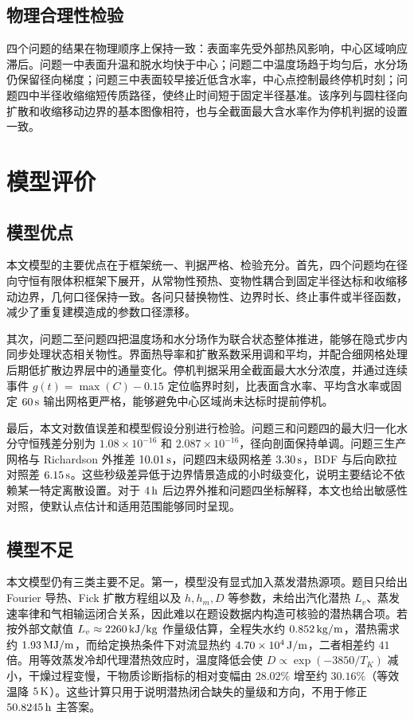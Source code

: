 \documentclass[UTF8,a4paper,12pt]{ctexart}
\numberwithin{equation}{section}
\begin{document}
\subsection{物理合理性检验}
四个问题的结果在物理顺序上保持一致：表面率先受外部热风影响，中心区域响应滞后。问题一中表面升温和脱水均快于中心；问题二中温度场趋于均匀后，水分场仍保留径向梯度；问题三中表面较早接近低含水率，中心点控制最终停机时刻；问题四中半径收缩缩短传质路径，使终止时间短于固定半径基准。该序列与圆柱径向扩散和收缩移动边界的基本图像相符，也与全截面最大含水率作为停机判据的设置一致。

\section{模型评价}
\subsection{模型优点}
本文模型的主要优点在于框架统一、判据严格、检验充分。首先，四个问题均在径向守恒有限体积框架下展开，从常物性预热、变物性耦合到固定半径达标和收缩移动边界，几何口径保持一致。各问只替换物性、边界时长、终止事件或半径函数，减少了重复建模造成的参数口径漂移。

其次，问题二至问题四把温度场和水分场作为联合状态整体推进，能够在隐式步内同步处理状态相关物性。界面热导率和扩散系数采用调和平均，并配合细网格处理后期低扩散边界层中的通量变化。停机判据采用全截面最大水分浓度，并通过连续事件 $g(t)=\max(C)-0.15$ 定位临界时刻，比表面含水率、平均含水率或固定 $60\rm\,s$ 输出网格更严格，能够避免中心区域尚未达标时提前停机。

最后，本文对数值误差和模型假设分别进行检验。问题三和问题四的最大归一化水分守恒残差分别为 $1.08\times10^{-16}$ 和 $2.087\times10^{-16}$，径向剖面保持单调。问题三生产网格与 Richardson 外推差 $10.01\rm\,s$，问题四末级网格差 $3.30\rm\,s$，BDF 与后向欧拉对照差 $6.15\rm\,s$。这些秒级差异低于边界情景造成的小时级变化，说明主要结论不依赖某一特定离散设置。对于 $4\rm\,h$ 后边界外推和问题四坐标解释，本文也给出敏感性对照，使默认点估计和适用范围能够同时呈现。

\subsection{模型不足}
本文模型仍有三类主要不足。第一，模型没有显式加入蒸发潜热源项。题目只给出 Fourier 导热、Fick 扩散方程组以及 $h,h_m,D$ 等参数，未给出汽化潜热 $L_v$、蒸发速率律和气相输运闭合关系，因此难以在题设数据内构造可核验的潜热耦合项。若按外部文献值 $L_v\approx2260\rm\,kJ/kg$ 作量级估算，全程失水约 $0.852\rm\,kg/m$，潜热需求约 $1.93\rm\,MJ/m$，而给定换热条件下对流显热约 $4.70\times10^{4}\rm\,J/m$，二者相差约 $41$ 倍。用等效蒸发冷却代理潜热效应时，温度降低会使 $D\propto\exp(-3850/T_K)$ 减小，干燥过程变慢，干物质诊断指标的相对变幅由 $28.02\%$ 增至约 $30.16\%$（等效温降 $5\rm\,K$）。这些计算只用于说明潜热闭合缺失的量级和方向，不用于修正 $50.8245\rm\,h$ 主答案。
\end{document}

